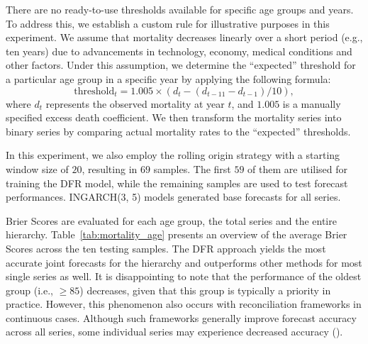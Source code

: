 \documentclass[a4paper,review,12pt,authoryear]{elsarticle}
\theoremstyle{definition}
\begin{document}
     There are no ready-to-use thresholds available for specific age groups and years.
     To address this, we establish a custom rule for illustrative purposes in this experiment.
     We assume that mortality decreases linearly over a short period (e.g., ten years) due to advancements in technology, economy, medical conditions and other factors.
     Under this assumption, we determine the ``expected'' threshold for a particular age group in a specific year by applying the following formula:
     \[
       \text{threshold}_t = 1.005 \times (d_t - (d_{t-11} - d_{t-1})/10),
     \]
     where $d_t$ represents the observed mortality at year $t$, and $1.005$ is a manually specified excess death coefficient.
     We then transform the mortality series into binary series by comparing actual mortality rates to the ``expected'' thresholds.

     In this experiment, we also employ the rolling origin strategy with a starting window size of $20$, resulting in $69$ samples.
     The first $59$ of them are utilised for training the DFR model, while the remaining samples are used to test forecast performances.
     INGARCH(3, 5) models generated base forecasts for all series.

     Brier Scores are evaluated for each age group, the total series and the entire hierarchy.
     Table~\ref{tab:mortality_age} presents an overview of the average Brier Scores across the ten testing samples.
     The DFR approach yields the most accurate joint forecasts for the hierarchy and outperforms other methods for most single series as well.
     It is disappointing to note that the performance of the oldest group (i.e., $ \ge 85$) decreases, given that this group is typically a priority in practice.
     However, this phenomenon also occurs with reconciliation frameworks in continuous cases.
     Although such frameworks generally improve forecast accuracy across all series, some individual series may experience decreased accuracy (\citealp{zhangOptimalReconciliationImmutable2022a}).
\end{document}
